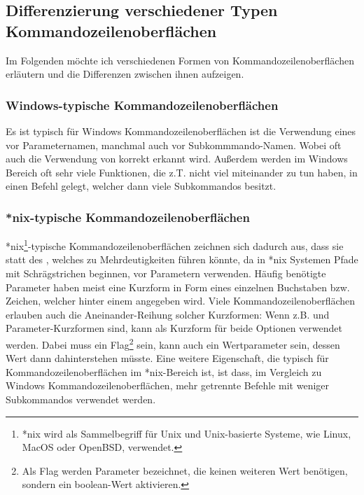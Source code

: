 \subsection{Differenzierung verschiedener Typen Kommandozeilenoberflächen}\label{subsec:DifferentCLITypes}
Im Folgenden möchte ich verschiedenen Formen von Kommandozeilenoberflächen erläutern und die Differenzen zwischen ihnen aufzeigen.
\subsubsection{Windows-typische Kommandozeilenoberflächen}
Es ist typisch für Windows Kommandozeilenoberflächen ist die Verwendung eines \inlinecode{/} vor Parameternamen, manchmal auch vor Subkommmando-Namen.
Wobei oft auch die Verwendung von \inlinecode{-} korrekt erkannt wird.
Au\ss erdem werden im Windows Bereich oft sehr viele Funktionen, die z.T. nicht viel miteinander zu tun haben, in einen Befehl gelegt, welcher dann viele Subkommandos besitzt.
\subsubsection{*nix-typische Kommandozeilenoberflächen}
*nix\footnote{*nix wird als Sammelbegriff für Unix und Unix-basierte Systeme, wie Linux, MacOS oder OpenBSD, verwendet.}-typische Kommandozeilenoberflächen
zeichnen sich dadurch aus, dass sie statt des \inlinecode{/}, welches zu Mehrdeutigkeiten führen könnte, da in *nix Systemen Pfade mit Schrägstrichen beginnen, vor Parametern \inlinecode{--} verwenden.
Häufig benötigte Parameter haben meist eine Kurzform in Form eines einzelnen Buchstaben bzw. Zeichen, welcher hinter einem \inlinecode{-} angegeben wird.
Viele Kommandozeilenoberflächen erlauben auch die Aneinander-Reihung solcher Kurzformen:
Wenn z.B.  und  Parameter-Kurzformen sind, kann  als Kurzform für beide Optionen verwendet werden.
Dabei muss  ein Flag\footnote{Als Flag werden Parameter bezeichnet, die keinen weiteren Wert benötigen, sondern ein boolean-Wert aktivieren.} sein,
 kann auch ein Wertparameter sein, dessen Wert dann dahinterstehen müsste.
Eine weitere Eigenschaft, die typisch für Kommandozeilenoberflächen im *nix-Bereich ist, ist dass,
im Vergleich zu Windows Kommandozeilenoberflächen, mehr getrennte Befehle mit weniger Subkommandos verwendet werden.
